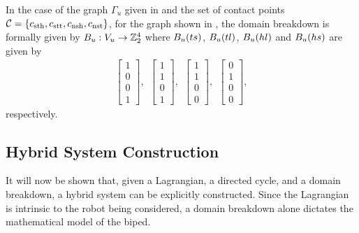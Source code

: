 \gap

\begin{exmp} \label{ex:domainbreakdown}
  In the case of the graph $\Gamma_{u}$ given in  and the set of contact points $\mathcal{C} =  \{c_{\mathrm{sth}}, c_{\mathrm{stt}}, c_{\mathrm{nsh}}, c_{\mathrm{nst}}\}$, for the graph shown in , the domain breakdown is formally given by $B_{u} : V_{u} \to \mathbb{Z}_{2}^{4}$ where $B_{u}(ts)$, $B_{u}(tl)$, $B_{u}(hl)$ and $B_{u}(hs)$ are given by
  \begin{align}
    \left[ \begin{array}{c} 1  \\ 0 \\ 0 \\ 1 \end{array} \right], \:\:
    \left[ \begin{array}{c} 1  \\ 1 \\ 0 \\ 1 \end{array} \right], \:\:
    \left[ \begin{array}{c} 1  \\ 1 \\ 0 \\ 0 \end{array} \right], \:\:
    \left[ \begin{array}{c} 0  \\ 1 \\ 0 \\ 0 \end{array} \right],
    \label{eq:domainbreakdownvectors}
  \end{align}
  respectively.
\end{exmp}

\subsection{Hybrid System Construction}
It will now be shown that, given a Lagrangian, a directed cycle, and a domain breakdown, a hybrid system can be explicitly constructed.  Since the Lagrangian is intrinsic to the robot being considered, a domain breakdown alone dictates the mathematical model of the biped.

